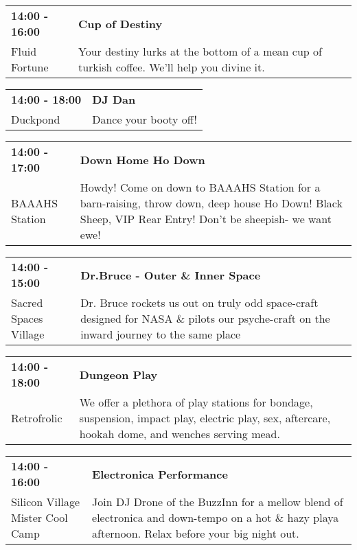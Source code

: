 \begin{tabular}{ p{1in} p{2.2in} }
    \textbf{14:00 - 16:00} & \textbf{Cup of Destiny} \\
    Fluid Fortune \newline  & Your destiny lurks at the bottom of a mean cup of turkish coffee. We'll help you divine it. \\
    \hline 
\end{tabular}
    
\begin{tabular}{ p{1in} p{2.2in} }
    \textbf{14:00 - 18:00} & \textbf{DJ Dan} \\
    Duckpond \newline  & Dance your booty off! \\
    \hline 
\end{tabular}
    
\begin{tabular}{ p{1in} p{2.2in} }
    \textbf{14:00 - 17:00} & \textbf{Down Home Ho Down} \\
    BAAAHS Station \newline  & Howdy! Come on down to BAAAHS Station for a barn-raising, throw down, deep house Ho Down! Black Sheep, VIP Rear Entry! Don't be sheepish- we want ewe! \\
    \hline 
\end{tabular}
    
\begin{tabular}{ p{1in} p{2.2in} }
    \textbf{14:00 - 15:00} & \textbf{Dr.Bruce - Outer \& Inner Space } \\
    Sacred Spaces Village \newline  & Dr. Bruce  rockets us out on truly odd space-craft designed for NASA \& pilots our psyche-craft on the inward journey to the same place \\
    \hline 
\end{tabular}
    
\begin{tabular}{ p{1in} p{2.2in} }
    \textbf{14:00 - 18:00} & \textbf{Dungeon Play} \\
    Retrofrolic \newline  & We offer a plethora of play stations for bondage, suspension, impact play, electric play, sex, aftercare, hookah dome, and wenches serving mead. \\
    \hline 
\end{tabular}
    
\begin{tabular}{ p{1in} p{2.2in} }
    \textbf{14:00 - 16:00} & \textbf{Electronica Performance} \\
    Silicon Village \newline Mister Cool Camp & Join DJ Drone of the BuzzInn for a mellow blend of electronica and down-tempo on a hot \& hazy playa afternoon.  Relax before your big night out. \\
    \hline 
\end{tabular}
    
